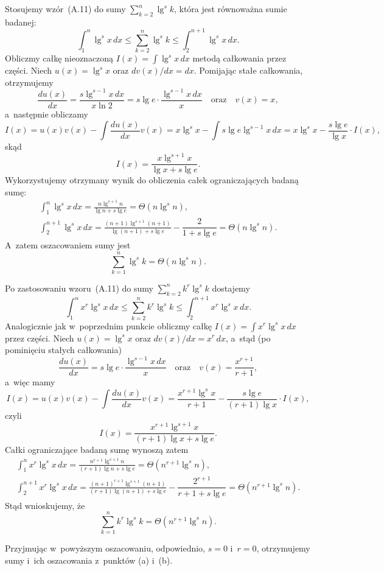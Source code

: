 \subproblem %
Stosujemy wzór~(A.11) do sumy $\sum_{k=2}^n\lg^sk$, która jest równoważna sumie badanej:
\[
	\int_1^n\lg^sx\,dx \le \sum_{k=2}^n\lg^sk \le \int_2^{n+1}\lg^sx\,dx.
\]
Obliczmy całkę nieoznaczoną $I(x)=\int\lg^sx\,dx$ metodą całkowania przez części. Niech $u(x)=\lg^sx$ oraz $dv(x)/dx=dx$. Pomijając stałe całkowania, otrzymujemy
\[
	\frac{du(x)}{dx} = \frac{s\lg^{s-1}x\,dx}{x\ln 2} = s\lg e\cdot\frac{\lg^{s-1}x\,dx}{x} \quad\text{oraz}\quad v(x) = x,
\]
a~następnie obliczamy
\[
	I(x) = u(x)v(x)-\int\frac{du(x)}{dx}v(x) = x\lg^sx-\int s\lg e\lg^{s-1}x\,dx = x\lg^sx-\frac{s\lg e}{\lg x}\cdot I(x),
\]
skąd
\[
    I(x) = \frac{x\lg^{s+1}x}{\lg x+s\lg e}.
\]
Wykorzystujemy otrzymany wynik do obliczenia całek ograniczających badaną sumę:
\begin{gather*}
	{\int_1^n\lg^sx\,dx} = \frac{n\lg^{s+1}n}{\lg n+s\lg e} = \Theta(n\lg^sn), \\[2mm]
	{\int_2^{n+1}\lg^sx\,dx} = \frac{(n+1)\lg^{s+1}(n+1)}{\lg(n+1)+s\lg e}-\dfrac{2}{1+s\lg e} = \Theta(n\lg^sn).
\end{gather*}
A~zatem oszacowaniem sumy jest
\[
	\sum_{k=1}^n\lg^sk = \Theta(n\lg^sn).
\]

\subproblem %
Po zastosowaniu wzoru~(A.11) do sumy $\sum_{k=2}^nk^r\lg^sk$ dostajemy
\[
	\int_1^nx^r\lg^sx\,dx \le \sum_{k=2}^nk^r\lg^sk \le \int_2^{n+1}x^r\lg^sx\,dx.
\]
Analogicznie jak w~poprzednim punkcie obliczmy całkę $I(x)=\int x^r\lg^sx\,dx$ przez części. Niech $u(x)=\lg^sx$ oraz $dv(x)/dx=x^r\,dx$, a~stąd (po pominięciu stałych całkowania)
\[
	\frac{du(x)}{dx} = s\lg e\cdot\frac{\lg^{s-1}x\,dx}{x} \quad\text{oraz}\quad v(x) = \frac{x^{r+1}}{r+1},
\]
a~więc mamy
\[
	I(x) = u(x)v(x)-\int\frac{du(x)}{dx}v(x) = \frac{x^{r+1}\lg^sx}{r+1}-\frac{s\lg e}{(r+1)\lg x}\cdot I(x),
\]
czyli
\[
    I(x) = \frac{x^{r+1}\lg^{s+1}x}{(r+1)\lg x+s\lg e}.
\]
Całki ograniczające badaną sumę wynoszą zatem
\begin{gather*}
	{\int_1^nx^r\lg^sx\,dx} = \frac{n^{r+1}\lg^{s+1}n}{(r+1)\lg n+s\lg e} = \Theta(n^{r+1}\lg^sn), \\[2mm]
	{\int_2^{n+1}x^r\lg^sx\,dx} = \frac{(n+1)^{r+1}\lg^{s+1}(n+1)}{(r+1)\lg(n+1)+s\lg e}-\dfrac{2^{r+1}}{r+1+s\lg e} = \Theta(n^{r+1}\lg^sn).
\end{gather*}
Stąd wnioskujemy, że
\[
	\sum_{k=1}^nk^r\lg^sk = \Theta(n^{r+1}\lg^sn).
\]

Przyjmując w~powyższym oszacowaniu, odpowiednio, $s=0$ i~$r=0$, otrzymujemy sumy i~ich oszacowania z~punktów (a) i~(b).

\endinput
